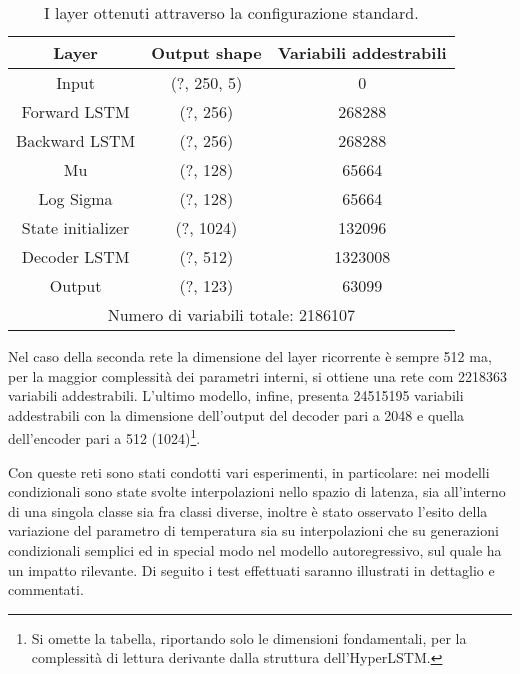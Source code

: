 \begin{table}[ht]
	\centering
	\begin{tabular}{ccc}
		\hline
		\hline
		Layer & Output shape & Variabili addestrabili \\
		\hline
		\hline
		Input & (?, 250, 5) & 0 \\
		\hline
		Forward LSTM & (?, 256) & 268288 \\
		\hline
		Backward LSTM & (?, 256) & 268288 \\
		\hline
		Mu & (?, 128) & 65664 \\
		\hline
		Log Sigma & (?, 128) & 65664 \\
		\hline
		State initializer & (?, 1024) & 132096 \\
		\hline
		Decoder LSTM & (?, 512) & 1323008 \\
		\hline
		Output & (?, 123) & 63099 \\
		\hline
		\hline
		\multicolumn{3}{c}{Numero di variabili totale: 2186107} \\
		\hline
		\hline
	\end{tabular}
	\caption{I layer ottenuti attraverso la configurazione standard.}
	\label{tab:2}
\end{table}

Nel caso della seconda rete la dimensione del layer ricorrente è sempre 512 ma, per la maggior complessità dei parametri interni, si ottiene una rete com 2218363 variabili addestrabili. L'ultimo modello, infine, presenta 24515195 variabili addestrabili con la dimensione dell'output del decoder pari a 2048 e quella dell'encoder pari a 512 (1024)\footnote{Si omette la tabella, riportando solo le dimensioni fondamentali, per la complessità di lettura derivante dalla struttura dell'HyperLSTM.}.

Con queste reti sono stati condotti vari esperimenti, in particolare: nei modelli condizionali sono state svolte interpolazioni nello spazio di latenza, sia all'interno di una singola classe sia fra classi diverse, inoltre è stato osservato l'esito della variazione del parametro di temperatura sia su interpolazioni che su generazioni condizionali semplici ed in special modo nel modello autoregressivo, sul quale ha un impatto rilevante.
Di seguito i test effettuati saranno illustrati in dettaglio e commentati.
